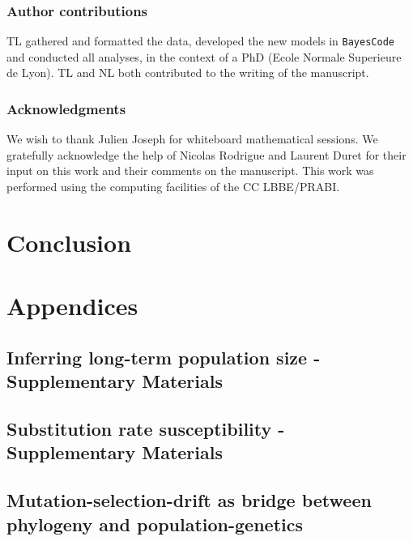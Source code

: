 \documentclass[a4paper,oneside,nobind]{thesis}
\begin{document}
\section{Author contributions}
TL gathered and formatted the data, developed the new models in \texttt{BayesCode} and conducted all analyses, in the context of a PhD (Ecole Normale Superieure de Lyon).
TL and NL both contributed to the writing of the manuscript.

\section{Acknowledgments}
We wish to thank Julien Joseph for whiteboard mathematical sessions.
We gratefully acknowledge the help of Nicolas Rodrigue and Laurent Duret for their input on this work and their comments on the manuscript.
This work was performed using the computing facilities of the CC LBBE/PRABI.

\part{Conclusion}
\label{part:conclusion}


\part{Appendices}

\thispagestyle{empty}
\chapter{Inferring long-term population size - Supplementary Materials}
{\hypersetup{linkcolor=GREYDARK}\minitoc}
\label{chap:MutSelDrift-SuppMat}


\thispagestyle{empty}
\chapter{Substitution rate susceptibility - Supplementary Materials}
{\hypersetup{linkcolor=GREYDARK}\minitoc}
\label{chap:GenoPhenoFit-SuppMat}


\chapter*{Mutation-selection-drift as bridge between phylogeny and population-genetics}
\label{sec-appendix:PRF}

\newpage

\thispagestyle{empty}
\label{sec-appendix:MutSelM3starMBE}


\thispagestyle{empty}


\end{document}
